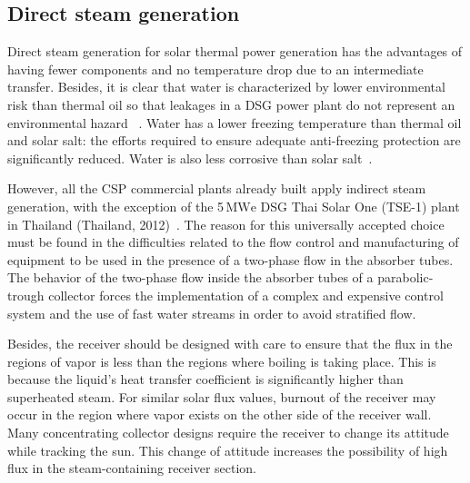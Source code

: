 \subsection{Direct steam generation}
Direct steam generation for solar thermal power generation has the advantages of having fewer components and no temperature drop due to an intermediate transfer. Besides, it is clear that water is characterized by lower environmental risk than thermal oil so that leakages in a DSG power plant do not represent an environmental hazard ~\cite{Fernandez2010}. Water has a lower freezing temperature than thermal oil and solar salt: the efforts required to ensure adequate anti-freezing protection are significantly reduced. Water is also less corrosive than solar salt~\cite{Giglio2017}.
 
However, all the CSP commercial plants already built apply indirect steam generation, with the exception of the 5$\,\mathrm{MWe}$ DSG Thai Solar One (TSE-1) plant in Thailand (Thailand, 2012)~\cite{Khenissi2015}. 
The reason for this universally accepted choice must be found in the difficulties related to the flow control and manufacturing of equipment to be used in the presence of a two-phase flow in the absorber tubes. 
The behavior of the two-phase flow inside the absorber tubes of a parabolic-trough collector forces the implementation of a complex and expensive control system and the use of fast water streams in order to avoid stratified flow.

Besides, the receiver should be designed with care to ensure that the flux in the regions of vapor is less than the regions where boiling is taking place.
This is because the liquid's heat transfer coefficient is significantly higher than superheated steam. For similar solar flux values, burnout of the receiver may occur in the region where vapor exists on the other side of the receiver wall. 
Many concentrating collector designs require the receiver to change its attitude while tracking the sun. This change of attitude increases the possibility of high flux in the steam-containing receiver section.
			
